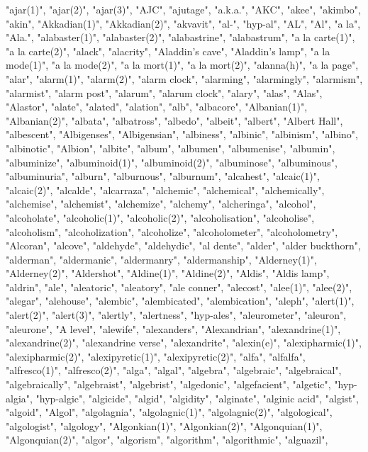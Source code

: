 "ajar(1)",
"ajar(2)",
"ajar(3)",
"AJC",
"ajutage",
"a.k.a.",
"AKC",
"akee",
"akimbo",
"akin",
"Akkadian(1)",
"Akkadian(2)",
"akvavit",
"al-",
"hyp-al",
"AL",
"Al",
"a la",
"Ala.",
"alabaster(1)",
"alabaster(2)",
"alabastrine",
"alabastrum",
"a la carte(1)",
"a la carte(2)",
"alack",
"alacrity",
"Aladdin's cave",
"Aladdin's lamp",
"a la mode(1)",
"a la mode(2)",
"a la mort(1)",
"a la mort(2)",
"alanna(h)",
"a la page",
"alar",
"alarm(1)",
"alarm(2)",
"alarm clock",
"alarming",
"alarmingly",
"alarmism",
"alarmist",
"alarm post",
"alarum",
"alarum clock",
"alary",
"alas",
"Alas",
"Alastor",
"alate",
"alated",
"alation",
"alb",
"albacore",
"Albanian(1)",
"Albanian(2)",
"albata",
"albatross",
"albedo",
"albeit",
"albert",
"Albert Hall",
"albescent",
"Albigenses",
"Albigensian",
"albiness",
"albinic",
"albinism",
"albino",
"albinotic",
"Albion",
"albite",
"album",
"albumen",
"albumenise",
"albumin",
"albuminize",
"albuminoid(1)",
"albuminoid(2)",
"albuminose",
"albuminous",
"albuminuria",
"alburn",
"alburnous",
"alburnum",
"alcahest",
"alcaic(1)",
"alcaic(2)",
"alcalde",
"alcarraza",
"alchemic",
"alchemical",
"alchemically",
"alchemise",
"alchemist",
"alchemize",
"alchemy",
"alcheringa",
"alcohol",
"alcoholate",
"alcoholic(1)",
"alcoholic(2)",
"alcoholisation",
"alcoholise",
"alcoholism",
"alcoholization",
"alcoholize",
"alcoholometer",
"alcoholometry",
"Alcoran",
"alcove",
"aldehyde",
"aldehydic",
"al dente",
"alder",
"alder buckthorn",
"alderman",
"aldermanic",
"aldermanry",
"aldermanship",
"Alderney(1)",
"Alderney(2)",
"Aldershot",
"Aldine(1)",
"Aldine(2)",
"Aldis",
"Aldis lamp",
"aldrin",
"ale",
"aleatoric",
"aleatory",
"ale conner",
"alecost",
"alee(1)",
"alee(2)",
"alegar",
"alehouse",
"alembic",
"alembicated",
"alembication",
"aleph",
"alert(1)",
"alert(2)",
"alert(3)",
"alertly",
"alertness",
"hyp-ales",
"aleurometer",
"aleuron",
"aleurone",
"A level",
"alewife",
"alexanders",
"Alexandrian",
"alexandrine(1)",
"alexandrine(2)",
"alexandrine verse",
"alexandrite",
"alexin(e)",
"alexipharmic(1)",
"alexipharmic(2)",
"alexipyretic(1)",
"alexipyretic(2)",
"alfa",
"alfalfa",
"alfresco(1)",
"alfresco(2)",
"alga",
"algal",
"algebra",
"algebraic",
"algebraical",
"algebraically",
"algebraist",
"algebrist",
"algedonic",
"algefacient",
"algetic",
"hyp-algia",
"hyp-algic",
"algicide",
"algid",
"algidity",
"alginate",
"alginic acid",
"algist",
"algoid",
"Algol",
"algolagnia",
"algolagnic(1)",
"algolagnic(2)",
"algological",
"algologist",
"algology",
"Algonkian(1)",
"Algonkian(2)",
"Algonquian(1)",
"Algonquian(2)",
"algor",
"algorism",
"algorithm",
"algorithmic",
"alguazil",
